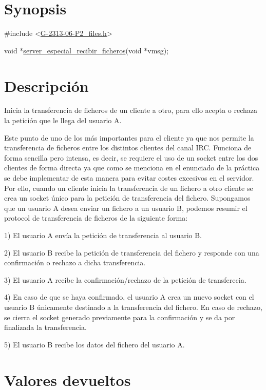 \hypertarget{server_especial_recibir_ficheros_synopsis_file_2}{}\section{Synopsis}\label{server_especial_recibir_ficheros_synopsis_file_2}

\begin{DoxyCode}
\textcolor{preprocessor}{#include <\hyperlink{G-2313-06-P2__files_8h}{G-2313-06-P2\_files.h}>}

\textcolor{keywordtype}{void} *\hyperlink{G-2313-06-P2__files_8h_a6796f20636727f52161d02748cb2b17e}{server\_especial\_recibir\_ficheros}(\textcolor{keywordtype}{void} *vmsg);
\end{DoxyCode}
 \hypertarget{server_especial_recibir_ficheros_descripcion_file_2}{}\section{Descripción}\label{server_especial_recibir_ficheros_descripcion_file_2}
Inicia la transferencia de ficheros de un cliente a otro, para ello acepta o rechaza la petición que le llega del usuario A.

Este punto de uno de los más importantes para el cliente ya que nos permite la transferencia de ficheros entre los distintos clientes del canal I\+RC. Funciona de forma sencilla pero intensa, es decir, se requiere el uso de un socket entre los dos clientes de forma directa ya que como se menciona en el enunciado de la práctica se debe implementar de esta manera para evitar costes excesivos en el servidor. Por ello, cuando un cliente inicia la transferencia de un fichero a otro cliente se crea un socket único para la petición de transferencia del fichero. Supongamos que un usuario A desea enviar un fichero a un usuario B, podemos resumir el protocol de transferencia de ficheros de la siguiente forma\+: 
\begin{DoxyItemize}
\item 1) El usuario A envía la petición de transferencia al usuario B. 
\item 2) El usuario B recibe la petición de transferencia del fichero y responde con una confirmación o rechazo a dicha transferencia. 
\item 3) El usuario A recibe la confirmación/rechazo de la petición de transferecia. 
\item 4) En caso de que se haya confirmado, el usuario A crea un nuevo socket con el usuario B únicamente destinado a la transferencia del fichero. En caso de rechazo, se cierra el socket generado previamente para la confirmación y se da por finalizada la transferencia. 
\item 5) El usuario B recibe los datos del fichero del usuario A. 
\end{DoxyItemize}\hypertarget{server_especial_recibir_ficheros_return_2}{}\section{Valores devueltos}\label{server_especial_recibir_ficheros_return_2}

